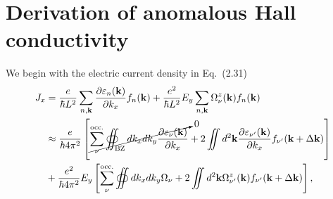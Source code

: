 \chapter{Derivation of anomalous Hall conductivity} \label{appendix A}

We begin with the electric current density in Eq.~(2.31)
\begin{equation}
	\begin{aligned}
		J_{x}
		&= \frac{e}{\hbar L^{2}} \sum_{n,\mathbf{k}} \frac{\partial \varepsilon_{n}(\mathbf{k})}{\partial k_{x}} f_{n}(\mathbf{k}) + \frac{e^{2}}{\hbar L^{2}} E_{y} \sum_{n,\mathbf{k}} \Omega_{\nu}^{z}(\mathbf{k}) f_{n}(\mathbf{k}) \\
		&\approx \frac{e}{\hbar 4 \pi^{2}} \left[  \cancelto{0}{\sum_{\nu}^{\text{occ.}} \oiint_{\text{BZ}} dk_{x} dk_{y} \frac{\partial \varepsilon_{\nu}(\mathbf{k})}{\partial k_{x}}} + 2 \iint d^{2}\mathbf{k} \frac{\partial \varepsilon_{\nu'}(\mathbf{k}) }{\partial k_{x}} f_{\nu'} (\mathbf{k} + \Delta \mathbf{k}) \right] \\
		& + \frac{e^{2}}{\hbar 4 \pi^{2}} E_{y} \left[ \sum_{\nu}^{\text{occ.}} \oiint dk_{x} dk_{y} \Omega_{\nu} + 2 \iint d^{2} \mathbf{k} \Omega_{\nu'}^{z}(\mathbf{k}) f_{\nu'} (\mathbf{k} +  \Delta \mathbf{k}) \right],
	\end{aligned}
\end{equation}


